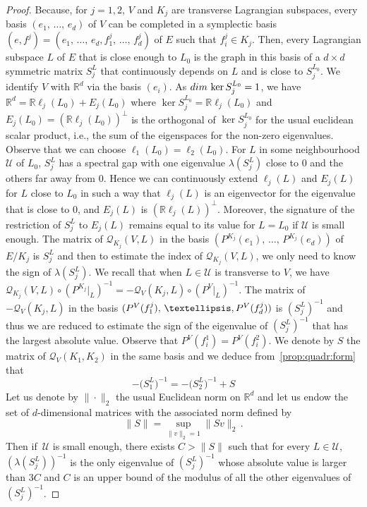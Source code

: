 \documentclass[10pt,a4paper]{amsart}
\numberwithin{equation}{section}
\newcommand*\cq{\mathcal{Q}}
\newcommand*\cU{\mathcal{U}}
\newcommand*\cal{\mathcal}
\newcommand*\R{\mathbb{R}}
\renewcommand*\dim{{\rm dim}\,}
\theoremstyle{definition}
\theoremstyle{remark}
\begin{document}
\begin{proof}
Because, for $j=1,2$, $V$ and $K_j$ are transverse Lagrangian subspa\-ces, every basis $(e_1, \,\dots,\, e_d)$ of $V$ can be completed in a symplectic basis $(e, f^j)=(e_1, \,\dots,\, e_d, f^j_1,\, \dots,\, f^j_d)$ of $E$ such that $f^j_i\in K_j$. Then, every Lagrangian subspace $L$ of $E$ that is close enough to $L_0$ is the graph in this basis of a $d\times d$ symmetric matrix $S_j^L$ that continuously depends on $L$ and is close to $S_j^{L_0}$.  We identify $V$ with $\R^d$ via the basis $(e_i)$.\newline
As $\dim\ker S_j^{L_0}=1$, we have $\R^d=\R \ell_j(L_0)+E_j(L_0)$ where $\ker S_j^{L_0}=\R\ell_j(L_0)$ and $E_j(L_0)=(\R \ell_j(L_0))^\bot$ is the orthogonal of $\ker S_j^{L_0}$ for the usual euclidean scalar product, i.e., the sum of the eigenspaces for the non-zero eigenvalues. Observe that we can choose $\ell_1(L_0)=\ell_2(L_0)$. For $L$ in some neighbourhood $\cU$ of $L_0$, $S_j^L$ has a spectral gap with one eigenvalue $\lambda(S_j^L)$ close to $0$ and the others far away from $0$. Hence we can continuously extend $\ell_j(L)$ and $E_j(L)$ for $L$ close to $L_0$ in such a way that $\ell_j(L)$ is an eigenvector for the eigenvalue that is close to $0$, and $E_j(L)$ is $(\R\ell_j(L))^\perp$. Moreover, the signature of the restriction of $S_j^L$ to $E_j(L)$ remains equal to its value for $L=L_0$ if $\cal U$ is small enough. \newline
The matrix of $\cq_{K_j}(V, L)$ in the basis $(P^{K_j}(e_1), \,\dots,\, P^{K_j}(e_d))$ of $E/K_j$ is $S_j^L$ and then to estimate the index of $\cq_{K_j}(V, L)$, we only need to know the sign of $\lambda(S_j^L)$.
We recall that when $L\in \cU$ is transverse to $V$, we have $\cq_{K_j}(V, L)\circ (P^{K_j}|_{L})^{-1}=-\cq_{V}(K_j, L)\circ(P^V|_{L})^{-1}$. The matrix of $-\cq_{V}(K_j, L)$ in the basis $(P^V(f_1^j),\,\dots,\linebreak P^V(f_d^j))$ is $(S_j^L)^{-1}$ and thus we are reduced to estimate the sign of the eigenvalue of $(S_j^L)^{-1}$ that has the largest absolute value. Observe that $P^V(f_i^1)=P^V(f_i^2)$. We denote by $S$ the matrix of $ \cq_{V}(K_1,K_2)$ in the same basis and we deduce from~\eqref{prop:quadr:form} that
\begin{equation}\label{Ematsym}
-\Big(S_1^L\Big)^{-1}=-\Big(S_2^L\Big)^{-1}+S
\end{equation}
Let us denote by $\|\cdot\|_2$ the usual Euclidean norm on $\R^d$ and let us endow the set of $d$-dimensional matrices with the associated norm defined by
\[
\| S\|=\sup_{\|v\|_2=1} \|Sv\|_2\,.
\]
Then if $\,\cU$ is small enough, there exists $C>\| S\|$ such that for every $L\in \cU$,
$(\lambda(S_j^L))^{-1}$ is the only eigenvalue of $(S_j^L)^{-1}$ whose absolute value is larger than $3C$ and $C$ is an upper bound of the modulus of all the other eigenvalues of $(S_j^L)^{-1}$.


\end{proof}
\end{document}

